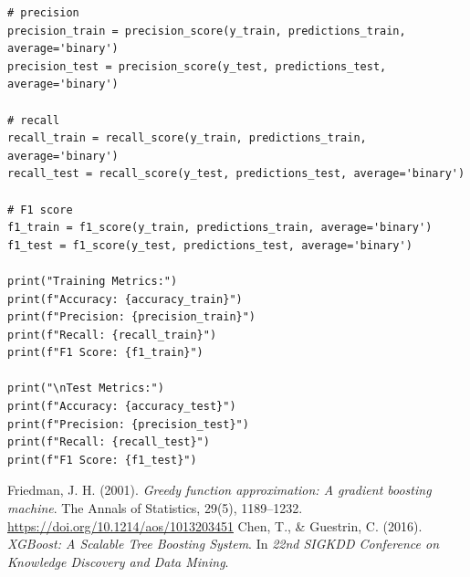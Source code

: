 \documentclass[12pt]{article}
\begin{document}
\begin{verbatim}
# precision
precision_train = precision_score(y_train, predictions_train, average='binary')
precision_test = precision_score(y_test, predictions_test, average='binary')

# recall
recall_train = recall_score(y_train, predictions_train, average='binary')
recall_test = recall_score(y_test, predictions_test, average='binary')

# F1 score
f1_train = f1_score(y_train, predictions_train, average='binary')
f1_test = f1_score(y_test, predictions_test, average='binary')

print("Training Metrics:")
print(f"Accuracy: {accuracy_train}")
print(f"Precision: {precision_train}")
print(f"Recall: {recall_train}")
print(f"F1 Score: {f1_train}")

print("\nTest Metrics:")
print(f"Accuracy: {accuracy_test}")
print(f"Precision: {precision_test}")
print(f"Recall: {recall_test}")
print(f"F1 Score: {f1_test}")

\end{verbatim}


\begin{thebibliography}{99}

Friedman, J. H. (2001). \textit{Greedy function approximation: A gradient boosting machine}. The Annals of Statistics, 29(5), 1189–1232. \url{https://doi.org/10.1214/aos/1013203451}
Chen, T., \& Guestrin, C. (2016). \textit{XGBoost: A Scalable Tree Boosting System}. In \textit{22nd SIGKDD Conference on Knowledge Discovery and Data Mining}.







\end{thebibliography}
\end{document}
